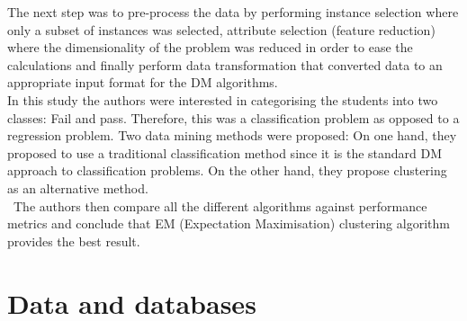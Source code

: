 \documentclass[11pt, oneside]{article}   	%
\begin{document}
The next step was to pre-process the data by performing instance selection where only a subset of instances was selected, attribute selection (feature reduction) where the dimensionality of the problem was reduced in order to ease the calculations and finally perform data transformation that converted data to an appropriate input format for the DM algorithms.\\
In this study the authors were interested in categorising the students into two classes: Fail and pass. Therefore, this was a classification problem as opposed to a regression problem. Two data mining methods were proposed: On one hand, they proposed to use a traditional classification method since it is the standard DM approach to classification problems. On the other hand, they propose clustering as an alternative method.\\\
The authors then compare all the different algorithms against performance metrics and conclude that EM (Expectation Maximisation) clustering algorithm provides the best result.

\section{Data and databases}
\end{document}
